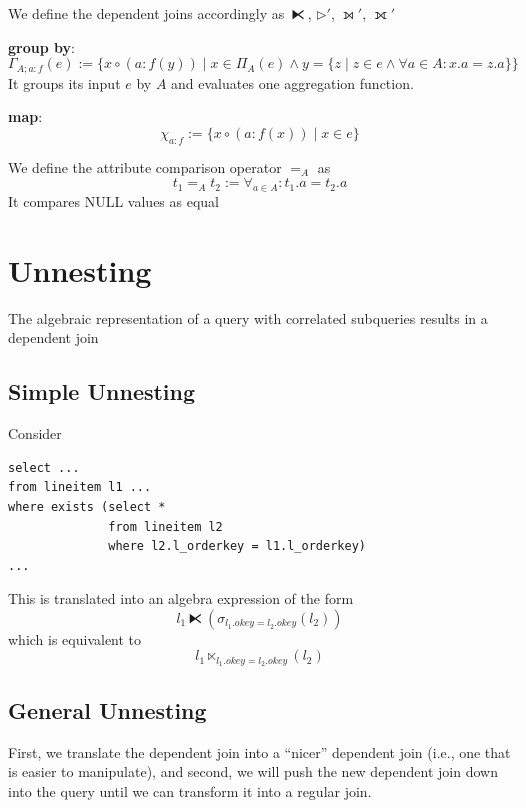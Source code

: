 \documentclass[11pt]{article}
\begin{document}
We define the dependent joins accordingly as \(\lftimes\), \(\rhd'\), \(\leftouterjoin'\), \(\fullouterjoin'\)

\textbf{group by}:
\begin{equation*}
\Gamma_{A;a:f}(e):=\{x\circ(a:f(y))\mid x\in\Pi_A(e)\wedge y=\{z\mid z\in e\wedge\forall a\in A:x.a=z.a\}\}
\end{equation*}
It groups its input \(e\) by \(A\) and evaluates one aggregation function.

\textbf{map}:
\begin{equation*}
\chi_{a:f}:=\{x\circ(a:f(x))\mid x\in e\}
\end{equation*}

We define the attribute comparison operator \(=_A\) as
\begin{equation*}
t_1=_At_2:=\forall_{a\in A}:t_1.a=t_2.a
\end{equation*}
It compares NULL values as equal
\section{Unnesting}
\label{sec:org471566d}
The algebraic representation of a query with correlated subqueries results in a dependent join
\subsection{Simple Unnesting}
\label{sec:org042c665}
Consider
\begin{verbatim}
select ...
from lineitem l1 ...
where exists (select *
              from lineitem l2
              where l2.l_orderkey = l1.l_orderkey)
...
\end{verbatim}
This is translated into an algebra expression of the form
\begin{equation*}
l_1\lftimes(\sigma_{l_1.okey=l_2.okey}(l_2))
\end{equation*}
which is equivalent to
\begin{equation*}
l_1\ltimes_{l_1.okey=l_2.okey}(l_2)
\end{equation*}
\subsection{General Unnesting}
\label{sec:orgc81aa7c}
First, we translate the dependent join into a “nicer” dependent join (i.e., one that is easier to
manipulate), and second, we will push the new dependent join down into the query until we can
transform it into a regular join.
\end{document}
